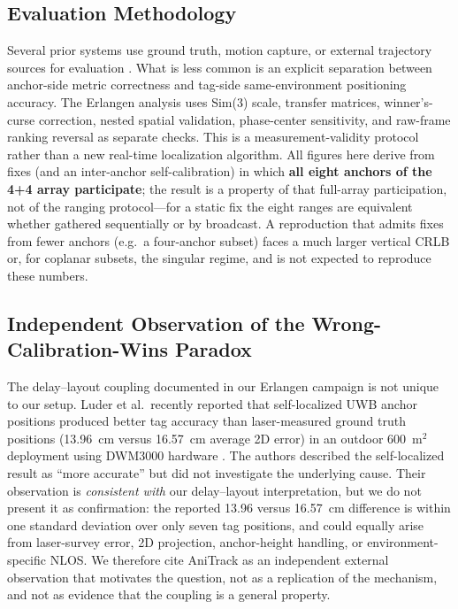 \documentclass[11pt,a4paper]{article}
\begin{document}
\subsection{Evaluation Methodology}

Several prior systems use ground truth, motion capture, or external trajectory sources for evaluation \citep{lutz_2019_visual_inertial_slam_uwb_error_model,ledergerber_2018_calibrating_away_inaccuracies_uwb,queralta_2020_uwb_based_system_for_uav}. What is less common is an explicit separation between anchor-side metric correctness and tag-side same-environment positioning accuracy. The Erlangen analysis uses Sim(3) scale, transfer matrices, winner's-curse correction, nested spatial validation, phase-center sensitivity, and raw-frame ranking reversal as separate checks. This is a measurement-validity protocol rather than a new real-time localization algorithm. All figures here derive from fixes (and an inter-anchor self-calibration) in which \textbf{all eight anchors of the 4+4 array participate}; the result is a property of that full-array participation, not of the ranging protocol---for a static fix the eight ranges are equivalent whether gathered sequentially or by broadcast. A reproduction that admits fixes from fewer anchors (e.g.\ a four-anchor subset) faces a much larger vertical CRLB or, for coplanar subsets, the singular regime, and is not expected to reproduce these numbers.

\subsection{Independent Observation of the Wrong-Calibration-Wins Paradox}

The delay--layout coupling documented in our Erlangen campaign is not unique to our
setup. Luder et al.\ recently reported that self-localized UWB anchor positions
produced better tag accuracy than laser-measured ground truth positions (13.96~cm
versus 16.57~cm average 2D error) in an outdoor 600~m$^2$ deployment using DWM3000
hardware \citep{luder_2025_anitrack}. The authors described the self-localized result as ``more accurate'' but did not
investigate the underlying cause. Their observation is \emph{consistent with} our
delay--layout interpretation, but we do not present it as confirmation: the reported
13.96 versus 16.57~cm difference is within one standard deviation over only seven tag
positions, and could equally arise from laser-survey error, 2D projection,
anchor-height handling, or environment-specific NLOS. We therefore cite AniTrack as an
independent external observation that motivates the question, not as a replication of
the mechanism, and not as evidence that the coupling is a general property.
\end{document}
